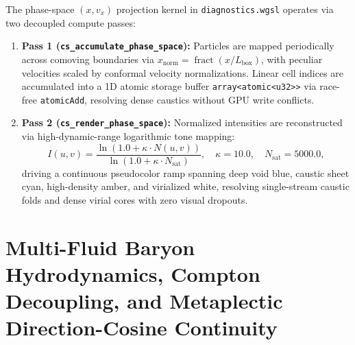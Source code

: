 \documentclass[11pt,letterpaper]{article}
\theoremstyle{plain}
\begin{document}
The phase-space $(x, v_x)$ projection kernel in \texttt{diagnostics.wgsl} operates via two decoupled compute passes:
\begin{enumerate}
    \item \textbf{Pass 1 (\texttt{cs\_accumulate\_phase\_space}):} Particles are mapped periodically across comoving boundaries via $x_{\mathrm{norm}} = \operatorname{fract}(x/L_{\mathrm{box}})$, with peculiar velocities scaled by conformal velocity normalizations. Linear cell indices are accumulated into a 1D atomic storage buffer \texttt{array<atomic<u32>>} via race-free \texttt{atomicAdd}, resolving dense caustics without GPU write conflicts.
    \item \textbf{Pass 2 (\texttt{cs\_render\_phase\_space}):} Normalized intensities are reconstructed via high-dynamic-range logarithmic tone mapping:
    \begin{equation}
    I(u, v) = \frac{\ln(1.0 + \kappa \cdot N(u, v))}{\ln(1.0 + \kappa \cdot N_{\mathrm{sat}})}, \quad \kappa = 10.0, \quad N_{\mathrm{sat}} = 5000.0,
    \end{equation}
    driving a continuous pseudocolor ramp spanning deep void blue, caustic sheet cyan, high-density amber, and virialized white, resolving single-stream caustic folds and dense virial cores with zero visual dropouts.
\end{enumerate}


\section{Multi-Fluid Baryon Hydrodynamics, Compton Decoupling, and Metaplectic Direction-Cosine Continuity}
\label{sec:metric-kinematics-cardy-virialization}
\end{document}
